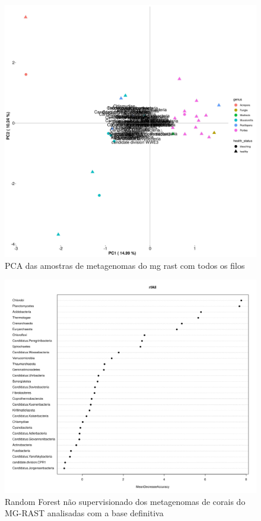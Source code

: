 \documentclass[12pt, a4paper]{report}
\begin{document}
\begin{figure}[!h]
  \centering
  \includegraphics[scale=0.5]{figures/output_PCA_corais_mg_rast_2018_10_23.jpg}
  \caption{PCA das amostras de metagenomas do mg rast com todos os filos}
\end{figure}

\begin{figure}[H]
\centering
\includegraphics[scale=0.5]{figures/randomforest_nao_supervisionado_corais_mg_rast_leticia_2018_10_23.png}
\caption{Random Forest não supervisionado dos metagenomas de corais do MG-RAST analisadas com a base definitiva}
\end{figure}
\end{document}
